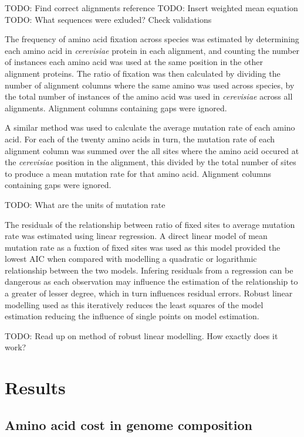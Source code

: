 TODO: Find correct alignments reference
TODO: Insert weighted mean equation
TODO: What sequences were exluded? Check validations

The frequency of amino acid fixation across species was estimated by determining each amino acid in \emph{cerevisiae} protein in each alignment, and counting the number of instances each amino acid was used at the same position in the other alignment proteins. The ratio of fixation was then calculated by dividing the number of alignment columns where the same amino was used across species, by the total number of instances of the amino acid was used in \emph{cerevisiae} across all alignments. Alignment columns containing gaps were ignored.

A similar method was used to calculate the average mutation rate of each amino acid. For each of the twenty amino acids in turn, the mutation rate of each alignment column was summed over the all sites where the amino acid occured at the \emph{cerevisiae} position in the alignment, this divided by the total number of sites to produce a mean mutation rate for that amino acid. Alignment columns containing gaps were ignored.

TODO: What are the units of mutation rate

The residuals of the relationship between ratio of fixed sites to average mutation rate was estimated using linear regression. A direct linear model of mean mutation rate as a fuxtion of fixed sites was used as this model provided the lowest AIC when compared with modelling a quadratic or logarithmic relationship between the two models. Infering residuals from a regression can be dangerous as each observation may influence the estimation of the relationship to a greater of lesser degree, which in turn influences residual errors. Robust linear modelling used as this iteratively reduces the least squares of the model estimation reducing the influence of single points on model estimation.

TODO: Read up on method of robust linear modelling. How exactly does it work?

\clearpage

\section{Results}

\subsection{Amino acid cost in genome composition}

